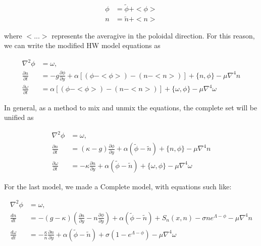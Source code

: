 \documentclass{hitec} %
\begin{document}
\begin{subequations}
\begin{align}
\phi & = \tilde{\phi} + <\phi> \\
n & = \tilde{n} + <n>
\end{align}
\end{subequations}

where $<...>$ represents the averagive in the poloidal direction. For this reason, we can write the modified HW model equations as 

\begin{subequations}
\begin{align}
 \nabla^2 \phi & =  \omega, \quad \\
 \frac{\partial n}{\partial t}    & = - g \frac{\partial \phi}{\partial y} + \alpha [(\phi - <\phi>) - (n - <n>)]
 + \{n, \phi\} - \mu \nabla^4 n \\
  \frac{\partial \omega}{\partial t} & = \alpha [(\phi - <\phi>) - (n - <n>)]  + \{ \omega, \phi\}
  - \mu\nabla^4\omega
\end{align}
\end{subequations}


In general, as a method to mix and unmix the equations, the complete set will be unified as

\begin{subequations}
\begin{align}
 \nabla^2 \phi & =  \omega, \quad \\
 \frac{\partial n}{\partial t}     & = (\kappa - g) \frac{\partial \phi}{\partial y} + \alpha (\tilde{\phi} - \tilde{n})
 + \{n, \phi\} - \mu \nabla^4 n \\
  \frac{\partial \omega}{\partial t} & =  - \kappa\frac{\partial n}{\partial y} + \alpha ( \tilde{\phi} - \tilde{n}) + \{ \omega, \phi\}
- \mu\nabla^4\omega
\end{align}
\end{subequations}


For the last model, we made a Complete model, with equations such like:

\begin{subequations}
\begin{align}
 \nabla^2 \phi & =  \omega, \quad  \\
 \frac{d n}{d t} & = -(g -\kappa) \left(\frac{\partial n}{\partial y} - n \frac{\partial \phi}{\partial y}\right) + \alpha (\tilde{\phi} - \tilde{n}) + S_n(x, n) - \sigma n e^{\Lambda - \phi} - \mu \nabla^4 n  \\
  \frac{d \omega}{d  t} & =  - \frac{\kappa}{n}\frac{\partial n}{\partial y} + \alpha ( \tilde{\phi} - \tilde{n}) +\sigma\left(1-e^{\Lambda-\phi}\right) - \mu\nabla^4\omega
\end{align}
\end{subequations}
\end{document}
